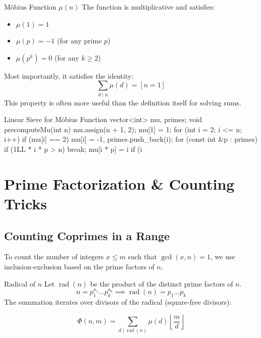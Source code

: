 \documentclass[11pt]{article}
\DeclareMathOperator{\rad}{rad}
\begin{document}
\begin{conceptbox}{Möbius Function $\mu(n)$}
    The function is multiplicative and satisfies:
    \begin{itemize}
        \item $\mu(1) = 1$
        \item $\mu(p) = -1$ (for any prime $p$)
        \item $\mu(p^k) = 0$ (for any $k \ge 2$)
    \end{itemize}
    Most importantly, it satisfies the identity:
    \[ \sum_{d \mid n} \mu(d) = [n = 1] \]
    This property is often more useful than the definition itself for solving sums.
\end{conceptbox}

\begin{vscode}{Linear Sieve for Möbius Function}
vector<int> mu, primes;
void precomputeMu(int n) 
{
    mu.assign(n + 1, 2); 
    mu[1] = 1;
    for (int i = 2; i <= n; i++) 
    {
        if (mu[i] == 2) 
            mu[i] = -1, primes.push_back(i);
        for (const int &p : primes) 
        {
            if (1LL * i * p > n) break;
            mu[i * p] = i %
            if (i %
        }
    }
}
\end{vscode}
\newpage
\section{Prime Factorization \& Counting Tricks}
\label{sec:prime_tricks}

\subsection{Counting Coprimes in a Range}
To count the number of integers $x \le m$ such that $\gcd(x, n) = 1$, we use inclusion-exclusion based on the prime factors of $n$.

\begin{conceptbox}{Radical of $n$}
    Let $\rad(n)$ be the product of the distinct prime factors of $n$.
    \[ n = p_1^{a_1} \dots p_k^{a_k} \implies \rad(n) = p_1 \dots p_k \]
    The summation iterates over divisors of the radical (square-free divisors):
\end{conceptbox}

\begin{resultbox}
    \begin{equation}
        \Phi(n, m) = \sum_{d \mid \rad(n)} \mu(d) \left\lfloor \frac{m}{d} \right\rfloor
    \end{equation}
\end{resultbox}
\end{document}

